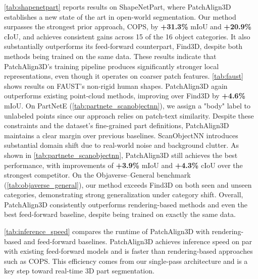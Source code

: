 \cref{tab:shapenetpart} reports results on ShapeNetPart, where PatchAlign3D
establishes a new state of the art in open-world segmentation. Our method surpasses the strongest prior approach,
COPS, by \textbf{+31.3\%} mIoU and \textbf{+20.9\%} cIoU, and achieves
consistent gains across 15 of the 16 object categories. It also substantially
outperforms its feed-forward counterpart, Find3D, despite both methods being trained
on the same data. These results indicate that PatchAlign3D's training pipeline produces significantly stronger local representations, even though it operates on coarser patch features.
\cref{tab:faust} shows results on FAUST's non-rigid human shapes.
PatchAlign3D again outperforms existing point-cloud methods, improving over Find3D by
\textbf{+4.6\%} mIoU.
On PartNetE (\cref{tab:partnete_scanobjectnn}), we assign a
"body" label to unlabeled points since our approach relies on patch-text similarity. Despite these constraints and the dataset's
fine-grained part definitions, PatchAlign3D maintains a clear margin over previous baselines.
ScanObjectNN introduces substantial domain shift due to real-world noise and background
clutter. As shown in \cref{tab:partnete_scanobjectnn}, PatchAlign3D still achieves
the best performance, with improvements of \textbf{+3.9\%} mIoU and \textbf{+4.3\%} cIoU over
the strongest competitor.
On the Objaverse–General benchmark (\cref{tab:objaverse_general}), our
method exceeds Find3D on both seen and unseen categories, demonstrating strong
generalization under category shift. Overall, PatchAlign3D consistently outperforms 
rendering-based methods and even the best feed-forward baseline, despite being trained on
exactly the same data.

\cref{tab:inference_speed} compares the runtime of PatchAlign3D with rendering-based and feed-forward baselines.
PatchAlign3D achieves inference speed on par with existing feed-forward models and is faster than rendering-based approaches such as COPS. This efficiency comes from our single-pass architecture and is a key step toward real-time 3D part segmentation.

